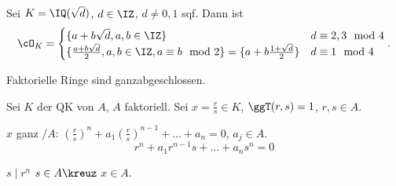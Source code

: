 \begin{Fakt}
Sei $K=\IQ(\sqrt{d})$, $d\in \IZ$, $d\neq 0,1$ sqf. Dann ist
\[\cO_K=\begin{cases}\{ a+b\sqrt{d}, a,b\in\IZ\} & d\equiv 2,3 \mod{4}\\ \{ \frac{a+b\sqrt d}{2}, a,b\in\IZ, a\equiv b\mod{2}\}=\{ a+b\frac{1+\sqrt{d}}{2}\} & d\equiv 1 \mod{4}\end{cases}.\]
\end{Fakt}

\begin{Fakt}
 Faktorielle Ringe sind ganzabgeschlossen.
\end{Fakt}

\begin{Beweis}
 Sei $K$ der QK von $A$, $A$ faktoriell. Sei $x=\frac{r}{s}\in K$, $\ggT(r,s)=1$, $r,s\in A$.
 
 $x$ ganz $/A$: $\left(\frac{r}{s}\right)^n+a_1\left(\frac{r}{s}\right)^{n-1}+\ldots+a_n=0$, $a_j\in A$.
 \[r^n + a_1 r^{n-1} s+ \ldots + a_ns^n=0 \]
 
 \folge $s\mid r^n$ \folge $s\in A\kreuz$ \folge $x\in A$.
\end{Beweis}










